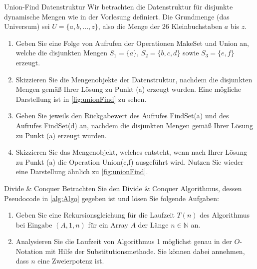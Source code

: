 \documentclass{article}
\begin{document}
\begin{exercise}{Union-Find Datenstruktur}
  Wir betrachten die Datenstruktur für disjunkte dynamische Mengen wie in der Vorlesung definiert. Die Grundmenge (das Universum) sei $U = \{a, b, . . . , z\}$, also die Menge der 26 Kleinbuchstaben $a$ bis $z$.
  \begin{enumerate}
    \item Geben Sie eine Folge von Aufrufen der Operationen MakeSet und Union an, welche die disjunkten Mengen $S_1 = \{a\}$, $S_2 = \{b, c, d\}$ sowie $S_3 = \{e, f\}$ erzeugt.
    \item Skizzieren Sie die Mengenobjekte der Datenstruktur, nachdem die disjunkten Mengen gemäß Ihrer Lösung zu Punkt (a) erzeugt wurden. Eine mögliche Darstellung ist in \ref{fig:unionFind} zu sehen.
    \item Geben Sie jeweils den Rückgabewert des Aufrufes FindSet(a) und des Aufrufes FindSet(d) an, nachdem die disjunkten Mengen gemäß Ihrer Lösung zu Punkt (a) erzeugt wurden.
    \item Skizzieren Sie das Mengenobjekt, welches entsteht, wenn nach Ihrer Lösung zu Punkt (a) die Operation Union(c,f) ausgeführt wird. Nutzen Sie wieder eine Darstellung ähnlich zu \ref{fig:unionFind}.
  \end{enumerate}
  

  \begin{solution}

  \end{solution}
\end{exercise}

\begin{exercise}{Divide \& Conquer}
  Betrachten Sie den Divide \& Conquer Algorithmus, dessen Pseudocode in \ref{alg:Algo} gegeben ist und lösen Sie folgende Aufgaben:
  \begin{enumerate}
    \item Geben Sie eine Rekursionsgleichung für die Laufzeit $T(n)$ des Algorithmus bei Eingabe $(A, 1, n)$ für ein Array $A$ der Länge $n \in \mathbb{N}$ an.
    \item Analysieren Sie die Laufzeit von Algorithmus 1 möglichst genau in der $O$-Notation mit Hilfe der Substitutionsmethode. Sie können dabei annehmen, dass $n$ eine Zweierpotenz ist.
  \end{enumerate}
  

  \begin{solution}

  \end{solution}
\end{exercise}
\end{document}
